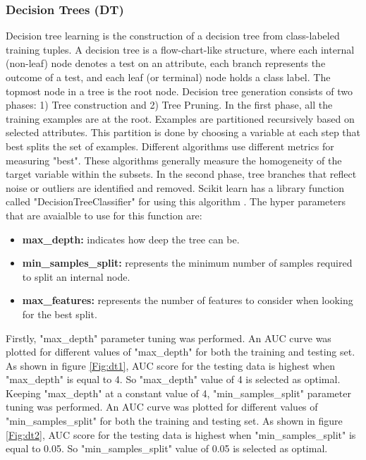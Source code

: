 \documentclass[journal]{IEEEtran}
\begin{document}
 \subsubsection{Decision Trees (DT)}
Decision tree learning is the construction of a decision tree from class-labeled training tuples. A decision tree is a flow-chart-like structure, where each internal (non-leaf) node denotes a test on an attribute, each branch represents the outcome of a test, and each leaf (or terminal) node holds a class label. The topmost node in a tree is the root node.  Decision tree generation consists of two phases: 1) Tree construction and 2) Tree Pruning. In the first phase, all the training examples are at the root. Examples are partitioned recursively based on selected attributes. This partition is done by choosing a variable at each step that best splits the set of examples. Different algorithms use different metrics for measuring "best". These algorithms generally measure the homogeneity of the target variable within the subsets. In the second phase, tree branches that reflect noise or outliers are identified and removed. Scikit learn has a library function called "DecisionTreeClassifier"  for using this algorithm \cite{dtree}. The hyper parameters that are avaialble to use for this function are:

\begin{itemize}
  \item \textbf{max\_depth:} indicates how deep the tree can be.
  \item \textbf{min\_samples\_split:} represents the minimum number of samples required to split an internal node.
  \item \textbf{max\_features:} represents the number of features to consider when looking for the best split.
\end{itemize}

Firstly, "max\_depth" parameter tuning was performed. An AUC curve was plotted for different values of "max\_depth" for both the training and testing set. As shown in figure \ref{Fig:dt1}, AUC score for the testing data is highest when "max\_depth" is equal to 4. So "max\_depth" value of 4 is selected as optimal. Keeping  "max\_depth"  at a constant value of 4,  "min\_samples\_split" parameter tuning was performed. An AUC curve was plotted for different values of "min\_samples\_split" for both the training and testing set. As shown in figure \ref{Fig:dt2}, AUC score for the testing data is highest when "min\_samples\_split"  is equal to 0.05. So "min\_samples\_split"  value of 0.05 is selected as optimal.\\
\end{document}
